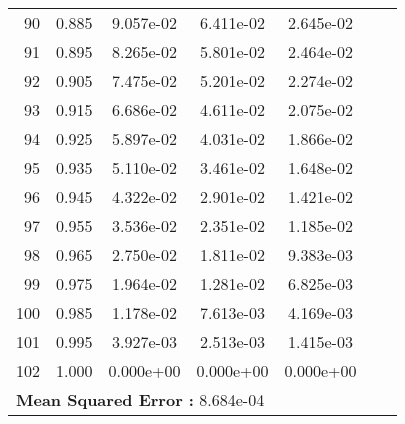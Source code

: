 \begin{table}[ht]
\begin{tabular}{rcccccc}
    90 &  0.885 &       9.057e-02 &       6.411e-02  &        2.645e-02\\ 
    91 &  0.895 &       8.265e-02 &       5.801e-02  &        2.464e-02\\ 
    92 &  0.905 &       7.475e-02 &       5.201e-02  &        2.274e-02\\ 
    93 &  0.915 &       6.686e-02 &       4.611e-02  &        2.075e-02\\ 
    94 &  0.925 &       5.897e-02 &       4.031e-02  &        1.866e-02\\ 
    95 &  0.935 &       5.110e-02 &       3.461e-02  &        1.648e-02\\ 
    96 &  0.945 &       4.322e-02 &       2.901e-02  &        1.421e-02\\ 
    97 &  0.955 &       3.536e-02 &       2.351e-02  &        1.185e-02\\ 
    98 &  0.965 &       2.750e-02 &       1.811e-02  &        9.383e-03\\ 
    99 &  0.975 &       1.964e-02 &       1.281e-02  &        6.825e-03\\ 
    100 &  0.985 &       1.178e-02 &       7.613e-03  &        4.169e-03\\ 
    101 &  0.995 &       3.927e-03 &       2.513e-03  &        1.415e-03\\ 
    102 &  1.000 &       0.000e+00 &       0.000e+00  &        0.000e+00\\ 
    \hline
     \multicolumn{5}{l}{\textbf{Mean Squared Error :} 8.684e-04}\\ 
  \end{tabular}
  \label{lbl:tabloExmp2_test}
\end{table}
